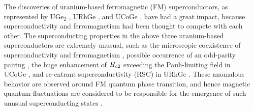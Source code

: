 \documentclass[twocolumn, aps, superscriptaddress, amsfonts,floatfix]{revtex4}%
\begin{document}
%



The discoveries of uranium-based ferromagnetic (FM) superconductors, as represented by UGe$_2$ \cite{saxena2000superconductivity}, URhGe \cite{aoki2001coexistence}, and UCoGe \cite{huy2007superconductivity}, have had a great impact, because superconductivity and  ferromagnetism had been thought to compete with each other. 
 The superconducting properties in the above three uranium-based
 superconductors are extremely unusual, such as the microscopic coexistence of superconductivity and ferromagnetism  \cite{hattori2012superconductivity, ohta2010microscopic, PhysRevLett.102.167003, kotegawaJPSJ.74.705coexist}, 
possible occurrence of an odd-parity pairing \cite{saxena2000superconductivity, aoki2001coexistence, huy2007superconductivity}, 
the huge enhancement of $H_{\rm c2}$ exceeding the Pauli-limiting field in UCoGe \cite{huy2007superconductivity, 200915989}, and  re-entrant superconductivity (RSC) in URhGe \cite{levy2009coexistence}.
These anomalous behavior are observed around FM quantum phase transition, and hence 
 magnetic quantum fluctuations are considered to be responsible for the emergence of  such unusual superconducting states \cite{tokunaga2015reentrant, hattori2012superconductivity,taufour1742-6596-273-1-012017}.
\end{document}
